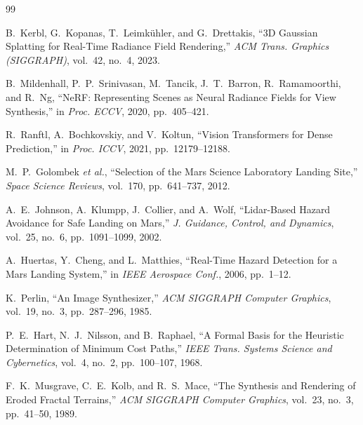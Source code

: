 \documentclass[12pt,a4paper]{report}
\begin{document}
\tableofcontents
\listoftables
\listoffigures

\cleardoublepage
{}










\begin{thebibliography}{99}

B.~Kerbl, G.~Kopanas, T.~Leimk\"uhler, and G.~Drettakis, ``3D Gaussian Splatting for Real-Time Radiance Field Rendering,'' \textit{ACM Trans. Graphics (SIGGRAPH)}, vol.~42, no.~4, 2023.

B.~Mildenhall, P.~P.~Srinivasan, M.~Tancik, J.~T.~Barron, R.~Ramamoorthi, and R.~Ng, ``NeRF: Representing Scenes as Neural Radiance Fields for View Synthesis,'' in \textit{Proc. ECCV}, 2020, pp.~405--421.

R.~Ranftl, A.~Bochkovskiy, and V.~Koltun, ``Vision Transformers for Dense Prediction,'' in \textit{Proc. ICCV}, 2021, pp.~12179--12188.

M.~P.~Golombek \textit{et al.}, ``Selection of the Mars Science Laboratory Landing Site,'' \textit{Space Science Reviews}, vol.~170, pp.~641--737, 2012.

A.~E.~Johnson, A.~Klumpp, J.~Collier, and A.~Wolf, ``Lidar-Based Hazard Avoidance for Safe Landing on Mars,'' \textit{J. Guidance, Control, and Dynamics}, vol.~25, no.~6, pp.~1091--1099, 2002.

A.~Huertas, Y.~Cheng, and L.~Matthies, ``Real-Time Hazard Detection for a Mars Landing System,'' in \textit{IEEE Aerospace Conf.}, 2006, pp.~1--12.

K.~Perlin, ``An Image Synthesizer,'' \textit{ACM SIGGRAPH Computer Graphics}, vol.~19, no.~3, pp.~287--296, 1985.

P.~E.~Hart, N.~J.~Nilsson, and B.~Raphael, ``A Formal Basis for the Heuristic Determination of Minimum Cost Paths,'' \textit{IEEE Trans. Systems Science and Cybernetics}, vol.~4, no.~2, pp.~100--107, 1968.

F.~K.~Musgrave, C.~E.~Kolb, and R.~S.~Mace, ``The Synthesis and Rendering of Eroded Fractal Terrains,'' \textit{ACM SIGGRAPH Computer Graphics}, vol.~23, no.~3, pp.~41--50, 1989.


\end{thebibliography}
\end{document}
